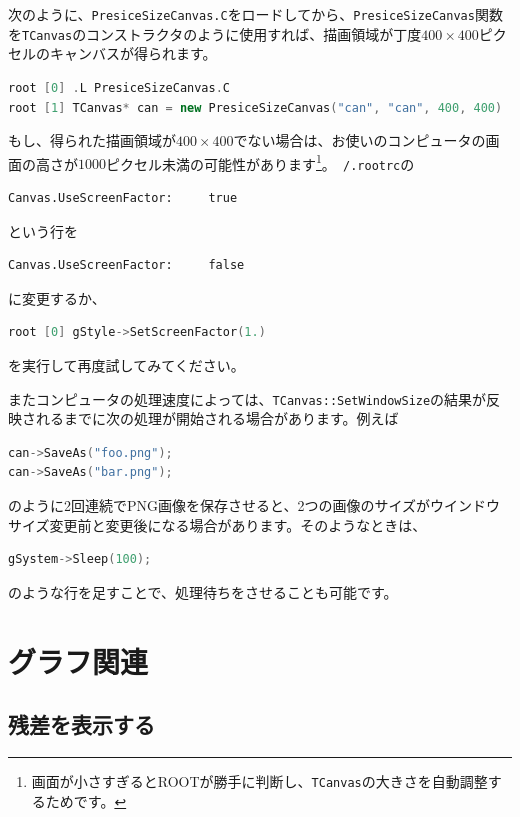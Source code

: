 次のように、\texttt{PresiceSizeCanvas.C}をロードしてから、\texttt{PresiceSizeCanvas}関数を\texttt{TCanvas}のコンストラクタのように使用すれば、描画領域が丁度$400\times400$ピクセルのキャンバスが得られます。
\begin{lstlisting}[language=C++]
root [0] .L PresiceSizeCanvas.C
root [1] TCanvas* can = new PresiceSizeCanvas("can", "can", 400, 400)
\end{lstlisting}
もし、得られた描画領域が$400\times400$でない場合は、お使いのコンピュータの画面の高さが$1000$ピクセル未満の可能性があります\footnote{画面が小さすぎるとROOTが勝手に判断し、\texttt{TCanvas}の大きさを自動調整するためです。}。\texttt{~/.rootrc}の
\begin{lstlisting}
Canvas.UseScreenFactor:     true
\end{lstlisting}
という行を
\begin{lstlisting}
Canvas.UseScreenFactor:     false
\end{lstlisting}
に変更するか、
\begin{lstlisting}[language=C++]
root [0] gStyle->SetScreenFactor(1.)
\end{lstlisting}
を実行して再度試してみてください。

またコンピュータの処理速度によっては、\texttt{TCanvas::SetWindowSize}の結果が反映されるまでに次の処理が開始される場合があります。例えば
\begin{lstlisting}[language=C++]
can->SaveAs("foo.png");
can->SaveAs("bar.png");
\end{lstlisting}
のように2回連続でPNG画像を保存させると、2つの画像のサイズがウインドウサイズ変更前と変更後になる場合があります。そのようなときは、
\begin{lstlisting}[language=C++]
gSystem->Sleep(100);
\end{lstlisting}
のような行を足すことで、処理待ちをさせることも可能です。

\section{グラフ関連}
\subsection{残差を表示する}

